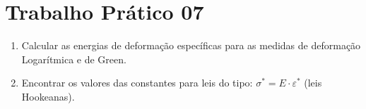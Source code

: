 


\section{Trabalho Prático 07}

\begin{enumerate}
    \item Calcular as energias de deformação específicas para as medidas de deformação
    Logarítmica e de Green.
    \item Encontrar os valores das constantes para leis do tipo: $\sigma^* = E\cdot
    \varepsilon^*$ (leis Hookeanas).
\end{enumerate}

